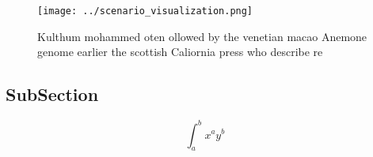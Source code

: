 \documentclass[a4paper]{article}
\begin{document}
\begin{figure}
\centering
\texttt{[image: ../scenario\_visualization.png]}
\caption{Kulthum mohammed oten ollowed by the venetian macao Anemone genome earlier the scottish Caliornia press who describe re
}
\end{figure}
 
\subsection{SubSection}

\[ \int_{a}^{b}{x^{a}y^{b}} \]
\end{document}
